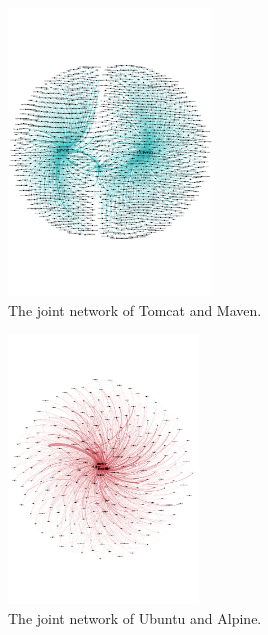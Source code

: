 \documentclass[sigconf]{acmart}
\begin{document}
\begin{figure}[htbp]
\centerline{\includegraphics[width=0.48\textwidth,trim=10 130 10 130,clip]{picture//image_network_pairs_maven_tomcat22.pdf}}
\caption{The joint network of Tomcat and Maven.}
\label{fig:maven-tomcat}
\end{figure}





\begin{figure}[htbp]
\centerline{\includegraphics[width=0.45\textwidth,trim=10 130 10 130,clip]{picture//image_network_pairs_ubuntu_alpine2.pdf}}
\caption{The joint network of Ubuntu and Alpine.}
\label{fig:ubuntu_alpine}
\end{figure}
\end{document}
